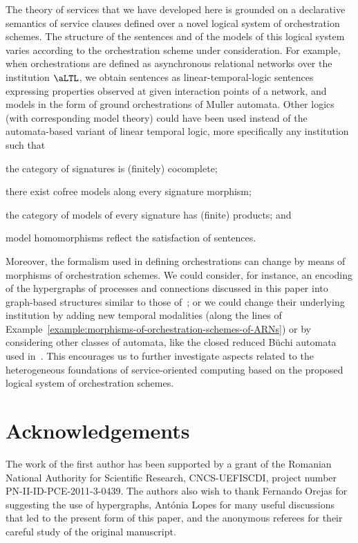 \documentclass{LMCS}
\begin{document}
  The theory of services that we have developed here is grounded on a declarative semantics of service clauses defined over a novel logical system of orchestration schemes.
  The structure of the sentences and of the models of this logical system varies according to the orchestration scheme under consideration.
  For example, when orchestrations are defined as asynchronous relational networks over the institution \(\aLTL\), we obtain sentences as linear-temporal-logic sentences expressing properties observed at given interaction points of a network, and models in the form of ground orchestrations of Muller automata.  Other logics (with corresponding model theory) could have been used instead of the automata-based variant of linear temporal logic, more specifically any institution such that
  \begin{inlinenum}

  \item the category of signatures is (finitely) cocomplete;

  \item there exist cofree models along every signature morphism;

  \item the category of models of every signature has (finite) products; and

  \item model homomorphisms reflect the satisfaction of sentences.

  \end{inlinenum}
  Moreover, the formalism used in defining orchestrations can change by means of morphisms of orchestration schemes.  We could consider, for instance, an encoding of the hypergraphs of processes and connections discussed in this paper into graph-based structures similar to those of~\cite{Fiadeiro-Lopes:Dynamic-reconfiguration-in-service-oriented-architectures-2013}; or we could change their underlying institution by adding new temporal modalities (along the lines of Example~\ref{example:morphisms-of-orchestration-schemes-of-ARNs}) or by considering other classes of automata, like the closed reduced B\"{u}chi automata used in~\cite{Alpern-Schneider:Recognizing-safety-and-liveness-1987,Fiadeiro-Lopes:An-interface-theory-for-service-oriented-design-2013}.
  This encourages us to further investigate aspects related to the heterogeneous foundations of service-oriented computing based on the proposed logical system of orchestration schemes.


  \section*{Acknowledgements}

  The work of the first author has been supported by a grant of the Romanian National Authority for Scientific Research, CNCS-UEFISCDI, project number PN-II-ID-PCE-2011-3-0439.
  The authors also wish to thank Fernando Orejas for suggesting the use of hypergraphs, Ant\'{o}nia Lopes for many useful discussions that led to the present form of this paper, and the anonymous referees for their careful study of the original manuscript.


  
  
\vspace{-30 pt}
\end{document}
